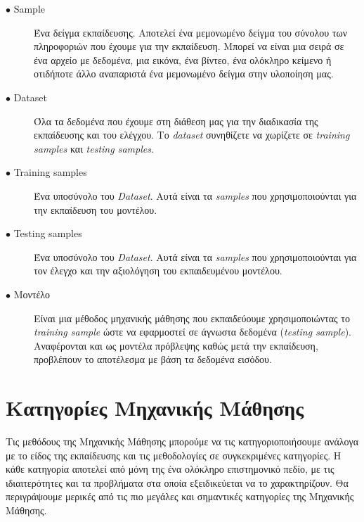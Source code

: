 \begin{description}

\item[$\bullet$ Sample] Ένα δείγμα εκπαίδευσης. Αποτελεί ένα μεμονωμένο δείγμα του σύνολου των πληροφοριών που έχουμε για την εκπαίδευση. Μπορεί να είναι μια σειρά σε ένα αρχείο με δεδομένα, μια εικόνα, ένα βίντεο, ένα ολόκληρο κείμενο ή οτιδήποτε άλλο αναπαριστά ένα μεμονωμένο δείγμα στην υλοποίηση μας.

\item[$\bullet$ Dataset] Όλα τα δεδομένα που έχουμε στη διάθεση μας για την διαδικασία της εκπαίδευσης και του ελέγχου. Το \textit{dataset} συνηθίζετε να χωρίζετε σε \textit{training samples} και \textit{testing samples}. 

\item[$\bullet$ Training samples] Ένα υποσύνολο του \textit{Dataset}. Αυτά είναι τα \textit{samples} που χρησιμοποιούνται για την εκπαίδευση του μοντέλου. 

\item[$\bullet$ Testing samples] Ένα υποσύνολο του \textit{Dataset}. Αυτά είναι τα \textit{samples} που χρησιμοποιούνται για τον έλεγχο και την αξιολόγηση του εκπαιδευμένου μοντέλου. 

\item[$\bullet$ Μοντέλο] Είναι μια μέθοδος μηχανικής μάθησης που εκπαιδεύουμε χρησιμοποιώντας το \textit{training sample} ώστε να εφαρμοστεί σε άγνωστα δεδομένα (\textit{testing sample}). Αναφέρονται και ως μοντέλα πρόβλεψης καθώς μετά την εκπαίδευση, προβλέπουν το αποτέλεσμα με βάση τα δεδομένα εισόδου. 

\end{description}

\section{Κατηγορίες Μηχανικής Μάθησης}
Τις μεθόδους της Μηχανικής Μάθησης μπορούμε να τις κατηγοριοποιήσουμε ανάλογα με το είδος της εκπαίδευσης και τις μεθοδολογίες σε συγκεκριμένες κατηγορίες. Η κάθε κατηγορία αποτελεί από μόνη της ένα ολόκληρο επιστημονικό πεδίο, με τις ιδιαιτερότητες και τα προβλήματα στα οποία εξειδικεύεται να το χαρακτηρίζουν. Θα περιγράψουμε μερικές από τις πιο μεγάλες και σημαντικές κατηγορίες της Μηχανικής Μάθησης.

